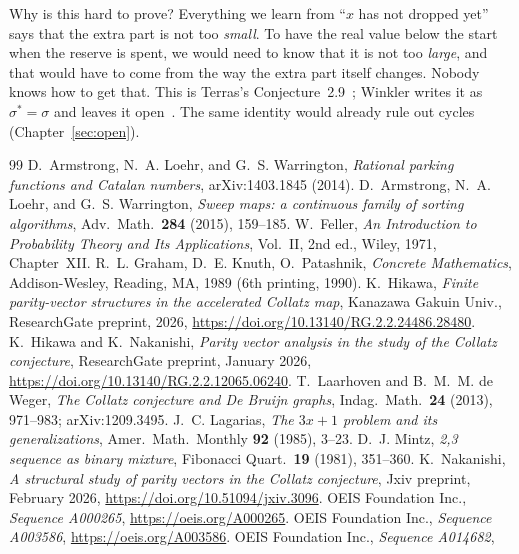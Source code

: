 \documentclass[11pt,a4paper,titlepage]{article}
\begin{document}
\nopagebreak
Why is this hard to prove? Everything we learn from ``$x$ has not dropped yet''
says that the extra part is not too \emph{small}. To have the real value below the
start when the reserve is spent, we would need to know that it is not too
\emph{large}, and that would have to come from the way the extra part itself changes. Nobody knows how to get
that. This is Terras's Conjecture~2.9~\cite{Terras1976}; Winkler writes it
as $\sigma^* = \sigma$ and leaves it open~\cite{Winkler2017}. The same identity would already rule out
cycles (Chapter~\ref{sec:open}).

\begin{thebibliography}{99}
 D.~Armstrong, N.~A. Loehr, and G.~S. Warrington, \emph{Rational
  parking functions and Catalan numbers}, arXiv:1403.1845 (2014).
 D.~Armstrong, N.~A. Loehr, and G.~S. Warrington, \emph{Sweep maps:
  a continuous family of sorting algorithms}, Adv.\ Math.\ \textbf{284} (2015), 159--185.
 W.~Feller, \emph{An Introduction to Probability Theory and
  Its Applications}, Vol.~II, 2nd ed., Wiley, 1971, Chapter~XII.
 R.~L. Graham, D.~E. Knuth, O.~Patashnik, \emph{Concrete
  Mathematics}, Addison-Wesley, Reading, MA, 1989 (6th printing, 1990).
 K.~Hikawa, \emph{Finite parity-vector structures in the
  accelerated Collatz map}, Kanazawa Gakuin Univ., ResearchGate preprint, 2026,
  \url{https://doi.org/10.13140/RG.2.2.24486.28480}.
 K.~Hikawa and K.~Nakanishi, \emph{Parity vector
  analysis in the study of the Collatz conjecture}, ResearchGate preprint,
  January 2026, \url{https://doi.org/10.13140/RG.2.2.12065.06240}.
 T.~Laarhoven and B.~M.~M. de Weger, \emph{The Collatz
  conjecture and De Bruijn graphs}, Indag.\ Math.\ \textbf{24} (2013), 971--983;
  arXiv:1209.3495.
 J.~C. Lagarias, \emph{The $3x+1$ problem and its
  generalizations}, Amer.\ Math.\ Monthly \textbf{92} (1985), 3--23.
 D.~J. Mintz, \emph{2,3 sequence as binary mixture}, Fibonacci
  Quart.\ \textbf{19} (1981), 351--360.
 K.~Nakanishi, \emph{A structural study of parity
  vectors in the Collatz conjecture}, Jxiv preprint, February 2026,
  \url{https://doi.org/10.51094/jxiv.3096}.
 OEIS Foundation Inc., \emph{Sequence A000265},
  \url{https://oeis.org/A000265}.
 OEIS Foundation Inc., \emph{Sequence A003586},
  \url{https://oeis.org/A003586}.
 OEIS Foundation Inc., \emph{Sequence A014682},

\end{thebibliography}
\end{document}
